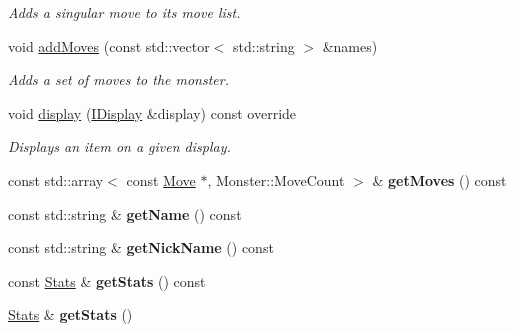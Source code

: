 \begin{DoxyCompactItemize}
\begin{DoxyCompactList}\small\item\em Adds a singular move to its move list. \end{DoxyCompactList}\item 
void \hyperlink{classmonsterbattle_1_1monster_1_1Monster_a6beddc490fcac80728ce522fc46b1873}{add\+Moves} (const std\+::vector$<$ std\+::string $>$ \&names)
\begin{DoxyCompactList}\small\item\em Adds a set of moves to the monster. \end{DoxyCompactList}\item 
void \hyperlink{classmonsterbattle_1_1monster_1_1Monster_af821d28493e308134ed5d7cad2e567a4}{display} (\hyperlink{structmonsterbattle_1_1IDisplay}{I\+Display} \&display) const override
\begin{DoxyCompactList}\small\item\em Displays an item on a given display. \end{DoxyCompactList}\item 
\mbox{\label{classmonsterbattle_1_1monster_1_1Monster_a2b3e7cea0d0ef62268ef1887d99298a4}} 
const std\+::array$<$ const \hyperlink{classmonsterbattle_1_1monster_1_1Move}{Move} $\ast$, Monster\+::\+Move\+Count $>$ \& {\bfseries get\+Moves} () const
\item 
\mbox{\label{classmonsterbattle_1_1monster_1_1Monster_aa908a5bb486ae531049d0576dd005218}} 
const std\+::string \& {\bfseries get\+Name} () const
\item 
\mbox{\label{classmonsterbattle_1_1monster_1_1Monster_abe7fc614ff6cbea9374b18b1af90ff96}} 
const std\+::string \& {\bfseries get\+Nick\+Name} () const
\item 
\mbox{\label{classmonsterbattle_1_1monster_1_1Monster_abfe43e50102dae503f3d1f81de1d045f}} 
const \hyperlink{structmonsterbattle_1_1monster_1_1Stats}{Stats} \& {\bfseries get\+Stats} () const
\item 
\mbox{\label{classmonsterbattle_1_1monster_1_1Monster_a56b3757f07e9a501b1e9046212065950}} 
\hyperlink{structmonsterbattle_1_1monster_1_1Stats}{Stats} \& {\bfseries get\+Stats} ()

\end{DoxyCompactItemize}
